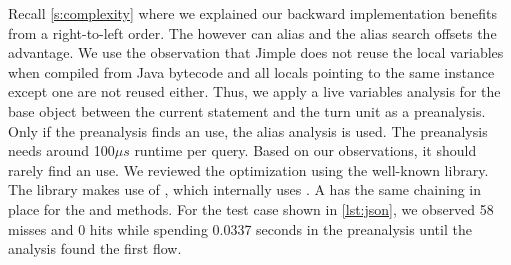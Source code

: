 \documentclass[../draft.tex]{subfiles}
\begin{document}
    Recall \autoref{s:complexity} where we explained our backward implementation benefits from a right-to-left order.
    The  however can alias and the alias search offsets the advantage.
    We use the observation that Jimple does not reuse the local variables when compiled from Java bytecode and all locals pointing to the same  instance except one are not reused either.
    Thus, we apply a live variables analysis for the base object between the current statement and the turn unit as a preanalysis.
    Only if the preanalysis finds an use, the alias analysis is used.
    The preanalysis needs around 100$\mu s$ runtime per query.
    Based on our observations, it should rarely find an use.
    We reviewed the optimization using the well-known \footnotemark{} library.
    The library makes use of , which internally uses . A  has the same chaining in place for the  and  methods.
    For the test case shown in \autoref{lst:json}, we observed 58 misses and 0 hits while spending 0.0337 seconds in the preanalysis until the analysis found the first flow.
\end{document}
